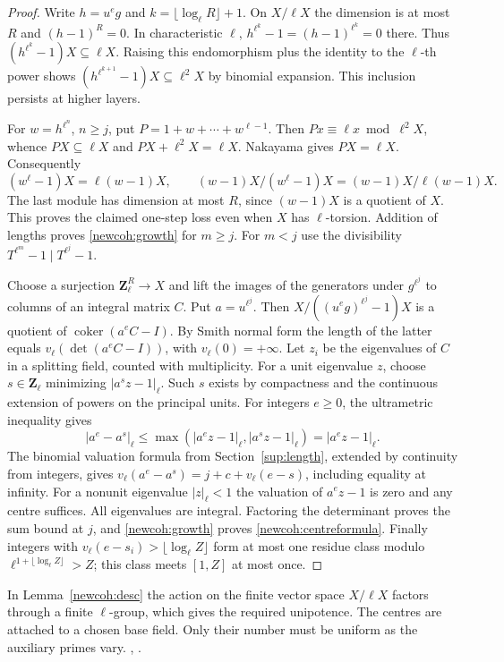\begin{proof}
Write \(h=u^eg\) and \(k=\lfloor\log_\ell R\rfloor+1\).
On \(X/\ell X\) the dimension is at most \(R\) and
\((h-1)^R=0\). In characteristic \(\ell\),
\(h^{\ell^k}-1=(h-1)^{\ell^k}=0\) there. Thus
\((h^{\ell^k}-1)X\subseteq\ell X\). Raising this endomorphism
plus the identity to the \(\ell\)-th power shows
\((h^{\ell^{k+1}}-1)X\subseteq\ell^2X\) by binomial expansion.
This inclusion persists at higher layers.

For \(w=h^{\ell^n}\), \(n\ge j\), put \(P=1+w+\cdots+w^{\ell-1}\).
Then \(Px\equiv\ell x\bmod\ell^2X\), whence \(PX\subseteq\ell X\)
and \(PX+\ell^2X=\ell X\). Nakayama gives \(PX=\ell X\).
Consequently
\[
 (w^\ell-1)X=\ell(w-1)X,\qquad
 (w-1)X/(w^\ell-1)X=(w-1)X/\ell(w-1)X .
\]
The last module has dimension at most \(R\), since \((w-1)X\) is a
quotient of \(X\). This proves the claimed one-step loss even when
\(X\) has \(\ell\)-torsion. Addition of lengths proves
\eqref{newcoh:growth} for \(m\ge j\). For \(m<j\) use the
divisibility \(T^{\ell^m}-1\mid T^{\ell^j}-1\).

Choose a surjection \(\mathbf Z_\ell^R\to X\) and lift the images of
the generators under \(g^{\ell^j}\) to columns of an integral matrix
\(C\). Put \(a=u^{\ell^j}\). Then \(X/((u^eg)^{\ell^j}-1)X\)
is a quotient of \(\operatorname{coker}(a^eC-I)\). By Smith normal form
the length of the latter equals \(v_\ell(\det(a^eC-I))\), with
\(v_\ell(0)=+\infty\). Let \(z_i\) be the eigenvalues of \(C\)
in a splitting field, counted with multiplicity. For a unit
eigenvalue \(z\), choose \(s\in\mathbf Z_\ell\) minimizing
\(\lvert a^s z-1\rvert_\ell\). Such \(s\) exists by compactness and
the continuous extension of powers on the principal units. For
integers \(e\ge0\), the ultrametric inequality gives
\[
 |a^e-a^s|_\ell\le\max(|a^e z-1|_\ell,|a^s z-1|_\ell)
 = |a^e z-1|_\ell .
\]
The binomial valuation formula from Section~\ref{sup:length}, extended
by continuity from integers, gives
\(v_\ell(a^e-a^s)=j+c+v_\ell(e-s)\), including equality at infinity.
For a nonunit eigenvalue \(|z|_\ell<1\) the valuation of \(a^e z-1\)
is zero and any centre suffices. All eigenvalues are integral.
Factoring the determinant proves the sum bound at \(j\), and
\eqref{newcoh:growth} proves \eqref{newcoh:centreformula}. Finally
integers with \(v_\ell(e-s_i)>\lfloor\log_\ell Z\rfloor\) form at
most one residue class modulo \(\ell^{1+\lfloor\log_\ell Z\rfloor}>Z\);
this class meets \([1,Z]\) at most once.
\end{proof}
In Lemma~\ref{newcoh:desc} the action on the finite vector space
\(X/\ell X\) factors through a finite \(\ell\)-group, which gives
the required unipotence. The centres are attached to a chosen base
field. Only their number must be uniform as the auxiliary primes vary.
,
.

